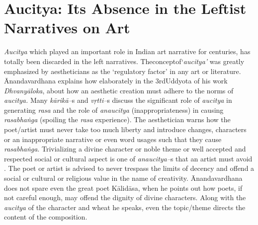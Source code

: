 \vspace{-.4cm}

\section*{Aucitya: Its Absence in the Leftist Narratives on Art}

\textit{Aucitya} which played an important role in Indian art narrative for centuries, has totally been discarded in the left narratives. Theconceptof‘\textit{aucitya’} was greatly emphasized by aestheticians as the ‘regulatory factor’ in any art or literature. Ānandavardhana explains how elaborately in the 3rdUddyota of his work \textit{Dhvanyāloka}, about how an aesthetic creation must adhere to the norms of \textit{aucitya.} Many \textit{kārikā–}s and \textit{vṛtti–}s discuss the significant role of \textit{aucitya} in generating \textit{rasa} and the role of \textit{anaucitya} (inappropriateness) in causing \textit{rasabhaṅga} (spoiling the \textit{rasa} experience). The aesthetician warns how the poet/artist must never take too much liberty and introduce changes, characters or an inappropriate narrative or even word usages such that they cause \textit{rasabhaṅga}. Trivializing a divine character or noble theme or well accepted and respected social or cultural aspect is one of \textit{anaucitya–}s that an artist must avoid . The poet or artist is advised to never trespass the limits of decency and offend a social or cultural or religious value in the name of creativity. Ānandavardhana does not spare even the great poet Kālidāsa, when he points out how poets, if not careful enough, may offend the dignity of divine characters.  Along with the \textit{aucitya} of the character and wheat he speaks, even the topic/theme directs the content of the composition.

